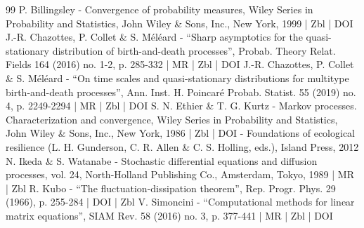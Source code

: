 \documentclass[10pt]{amsart}
\numberwithin{equation}{section}
\theoremstyle{plain}
\theoremstyle{definition}
\begin{document}
\begin{thebibliography}{99}
P. Billingsley - Convergence of probability measures, Wiley Series in Probability and Statistics, John Wiley \& Sons, Inc., New York, 1999 | Zbl | DOI
J.-R. Chazottes, P. Collet \& S. Méléard - “Sharp asymptotics for the quasi-stationary distribution of birth-and-death processes”, Probab. Theory Relat. Fields 164 (2016) no. 1-2, p. 285-332 | MR | Zbl | DOI
J.-R. Chazottes, P. Collet \& S. Méléard - “On time scales and quasi-stationary distributions for multitype birth-and-death processes”, Ann. Inst. H. Poincaré Probab. Statist. 55 (2019) no. 4, p. 2249-2294 | MR | Zbl | DOI
S. N. Ethier \& T. G. Kurtz - Markov processes. Characterization and convergence, Wiley Series in Probability and Statistics, John Wiley \& Sons, Inc., New York, 1986 | Zbl | DOI
- Foundations of ecological resilience (L. H. Gunderson, C. R. Allen \& C. S. Holling, eds.), Island Press, 2012
N. Ikeda \& S. Watanabe - Stochastic differential equations and diffusion processes, vol. 24, North-Holland Publishing Co., Amsterdam, Tokyo, 1989 | MR | Zbl
R. Kubo - “The fluctuation-dissipation theorem”, Rep. Progr. Phys. 29 (1966), p. 255-284 | DOI | Zbl
V. Simoncini - “Computational methods for linear matrix equations”, SIAM Rev. 58 (2016) no. 3, p. 377-441 | MR | Zbl | DOI
\end{thebibliography}
\end{document}
